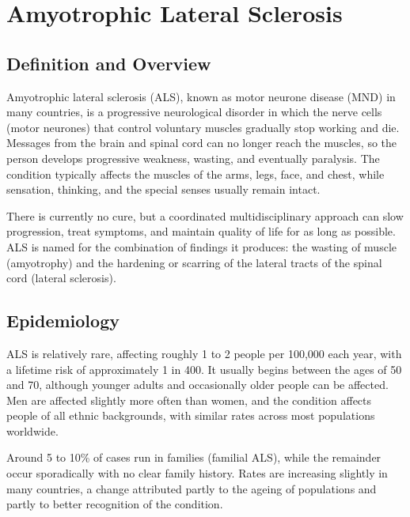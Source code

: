 \chapter{Amyotrophic Lateral Sclerosis}

\section*{Definition and Overview}
Amyotrophic lateral sclerosis (ALS), known as motor neurone disease (MND) in many countries, is a progressive neurological disorder in which the nerve cells (motor neurones) that control voluntary muscles gradually stop working and die. Messages from the brain and spinal cord can no longer reach the muscles, so the person develops progressive weakness, wasting, and eventually paralysis. The condition typically affects the muscles of the arms, legs, face, and chest, while sensation, thinking, and the special senses usually remain intact.

There is currently no cure, but a coordinated multidisciplinary approach can slow progression, treat symptoms, and maintain quality of life for as long as possible. ALS is named for the combination of findings it produces: the wasting of muscle (amyotrophy) and the hardening or scarring of the lateral tracts of the spinal cord (lateral sclerosis).

\section*{Epidemiology}
ALS is relatively rare, affecting roughly 1 to 2 people per 100,000 each year, with a lifetime risk of approximately 1 in 400. It usually begins between the ages of 50 and 70, although younger adults and occasionally older people can be affected. Men are affected slightly more often than women, and the condition affects people of all ethnic backgrounds, with similar rates across most populations worldwide.

Around 5 to 10\% of cases run in families (familial ALS), while the remainder occur sporadically with no clear family history. Rates are increasing slightly in many countries, a change attributed partly to the ageing of populations and partly to better recognition of the condition.

